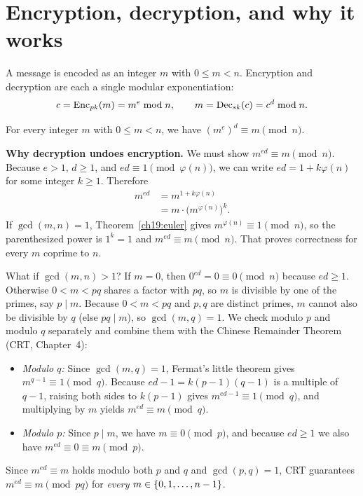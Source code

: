 \section{Encryption, decryption, and why it works}
\label{ch19:encdec}

A message is encoded as an integer $m$ with $0 \le m < n$. Encryption and decryption are each a single modular exponentiation:
\[
  c = \operatorname{Enc}_{pk}(m) = m^{e} \bmod n, \qquad
  m = \operatorname{Dec}_{sk}(c) = c^{d} \bmod n.
\]

\begin{theorem}
\label{ch19:correctness}
For every integer $m$ with $0\le m < n$, we have $(m^e)^d \equiv m \pmod n$.
\end{theorem}

\begin{whybox}
\textbf{Why decryption undoes encryption.} We must show $m^{ed}\equiv m\pmod n$. Because $e > 1$, $d \ge 1$, and $ed \equiv 1\pmod{\varphi(n)}$, we can write $ed = 1 + k\varphi(n)$ for some integer $k \ge 1$. Therefore
\begin{align*}
  m^{ed} &= m^{1+k\varphi(n)} \\
         &= m\cdot\bigl(m^{\varphi(n)}\bigr)^{k}.
\end{align*}
If $\gcd(m,n)=1$, Theorem~\ref{ch19:euler} gives $m^{\varphi(n)}\equiv 1\pmod n$, so the parenthesized power is $1^k = 1$ and $m^{ed}\equiv m \pmod n$. That proves correctness for every $m$ coprime to $n$.

What if $\gcd(m,n) > 1$? If $m = 0$, then $0^{ed} = 0 \equiv 0 \pmod n$ because $ed \ge 1$. Otherwise $0 < m < pq$ shares a factor with $pq$, so $m$ is divisible by one of the primes, say $p \mid m$. Because $0 < m < pq$ and $p,q$ are distinct primes, $m$ cannot also be divisible by $q$ (else $pq \mid m$), so $\gcd(m,q) = 1$. We check modulo $p$ and modulo $q$ separately and combine them with the Chinese Remainder Theorem (CRT, Chapter~4):
\begin{itemize}
  \item \emph{Modulo $q$:} Since $\gcd(m,q)=1$, Fermat's little theorem gives $m^{q-1}\equiv 1\pmod q$. Because $ed-1 = k(p-1)(q-1)$ is a multiple of $q-1$, raising both sides to $k(p-1)$ gives $m^{ed-1}\equiv 1\pmod q$, and multiplying by $m$ yields $m^{ed}\equiv m\pmod q$.
  \item \emph{Modulo $p$:} Since $p\mid m$, we have $m\equiv 0\pmod p$, and because $ed \ge 1$ we also have $m^{ed}\equiv 0\equiv m\pmod p$.
\end{itemize}
Since $m^{ed}\equiv m$ holds modulo both $p$ and $q$ and $\gcd(p,q)=1$, CRT guarantees $m^{ed}\equiv m\pmod{pq}$ for \emph{every} $m \in \{0,1,\dots,n-1\}$.
\end{whybox}

